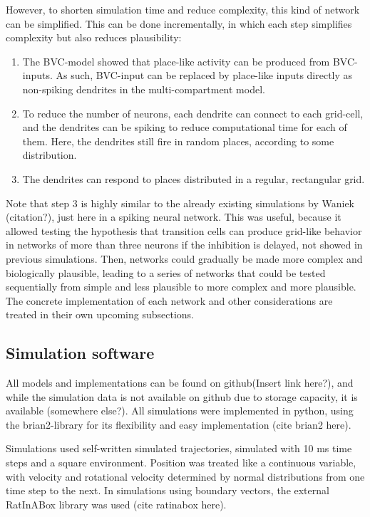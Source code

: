 \documentclass{article}
\begin{document}
    However, to shorten simulation time and reduce complexity, this kind of network can be simplified. This can be done incrementally, in which each step simplifies complexity but also reduces plausibility:
    \begin{enumerate}
        \item The BVC-model showed that place-like activity can be produced from BVC-inputs. As such, BVC-input can be replaced by place-like inputs directly as non-spiking dendrites in the multi-compartment model. 
        \item To reduce the number of neurons, each dendrite can connect to each grid-cell, and the dendrites can be spiking to reduce computational time for each of them. Here, the dendrites still fire in random places, according to some distribution.
        \item The dendrites can respond to places distributed in a regular, rectangular grid.
    \end{enumerate}
 
    Note that step 3 is highly similar to the already existing simulations by Waniek (citation?), just here in a spiking neural network. This was useful, because it allowed testing the hypothesis that transition cells can produce grid-like behavior in networks of more than three neurons if the inhibition is delayed, not showed in previous simulations. Then, networks could gradually be made more complex and biologically plausible, leading to a series of networks that could be tested sequentially from simple and less plausible to more complex and more plausible. The concrete implementation of each network and other considerations are treated in their own upcoming subsections.

    \subsection{Simulation software} All models and implementations can be found on github(Insert link here?), and while the simulation data is not available on github due to storage capacity, it is available (somewhere else?). All simulations were implemented in python, using the brian2-library for its flexibility and easy implementation (cite brian2 here). 
    
    Simulations used self-written simulated trajectories, simulated with 10 ms time steps and a square environment. Position was treated like a continuous variable, with velocity and rotational velocity determined by normal distributions from one time step to the next. In simulations using boundary vectors, the external RatInABox library was used (cite ratinabox here). 
    
\end{document}
